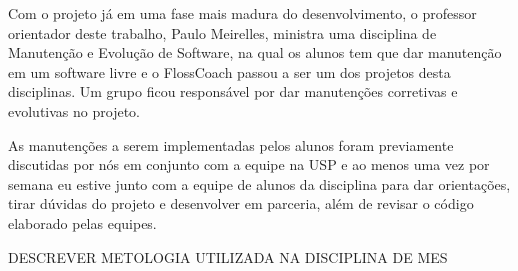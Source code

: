 Com o projeto já em uma fase mais madura do desenvolvimento, o professor orientador
deste trabalho, Paulo Meirelles, ministra uma disciplina de Manutenção e Evolução de
Software, na qual os alunos tem que dar manutenção em um software livre e o FlossCoach
passou a ser um dos projetos desta disciplinas. Um grupo ficou responsável por dar 
manutenções corretivas e evolutivas no projeto.

As manutenções a serem implementadas pelos alunos foram previamente discutidas
por nós em conjunto com a equipe na USP e ao menos uma vez por semana eu estive junto com a 
equipe de alunos da disciplina para dar orientações, tirar dúvidas do projeto
e desenvolver em parceria, além de revisar o código elaborado pelas equipes.
 
DESCREVER METOLOGIA UTILIZADA NA DISCIPLINA DE MES
